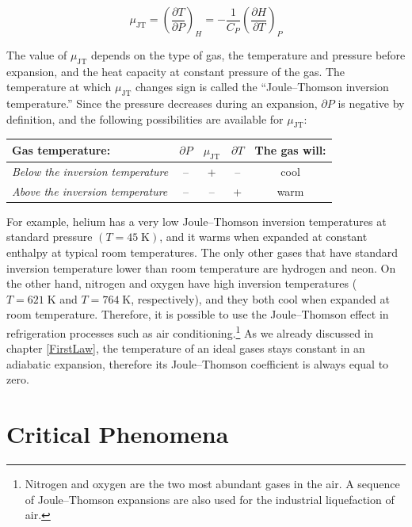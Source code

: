 \documentclass[
  9pt,
]{extbook}
\theoremstyle{definition}
\theoremstyle{definition}
\theoremstyle{definition}
\theoremstyle{remark}
\begin{document}
\begin{equation}
\mu_{\mathrm{JT}}=\left( \frac{\partial T}{\partial P} \right)_H=-\frac{1}{C_P} \left( \frac{\partial H}{\partial T} \right)_P
\label{eq:muJT}
\end{equation}

The value of \(\mu_{\mathrm{JT}}\) depends on the type of gas, the temperature and pressure before expansion, and the heat capacity at constant pressure of the gas. The temperature at which \(\mu_{\mathrm{JT}}\) changes sign is called the ``Joule--Thomson inversion temperature.'' Since the pressure decreases during an expansion, \(\partial P\) is negative by definition, and the following possibilities are available for \(\mu_{\mathrm{JT}}\):

\begin{longtable}[]{@{}lcccc@{}}
\toprule
Gas temperature: & \(\partial P\) & \(\mu_{\mathrm{JT}}\) & \(\partial T\) & The gas will: \\
\midrule
\endhead
\emph{Below the inversion temperature} & -- & + & -- & cool \\
\emph{Above the inversion temperature} & -- & -- & + & warm \\
\bottomrule
\end{longtable}

For example, helium has a very low Joule--Thomson inversion temperatures at standard pressure \((T=45\;\text{K})\), and it warms when expanded at constant enthalpy at typical room temperatures. The only other gases that have standard inversion temperature lower than room temperature are hydrogen and neon. On the other hand, nitrogen and oxygen have high inversion temperatures (\(T=621\;\text{K}\) and \(T=764\;\text{K}\), respectively), and they both cool when expanded at room temperature. Therefore, it is possible to use the Joule--Thomson effect in refrigeration processes such as air conditioning.\footnote{Nitrogen and oxygen are the two most abundant gases in the air. A sequence of Joule--Thomson expansions are also used for the industrial liquefaction of air.} As we already discussed in chapter \ref{FirstLaw}, the temperature of an ideal gases stays constant in an adiabatic expansion, therefore its Joule--Thomson coefficient is always equal to zero.

\hypertarget{critical-phenomena}{%
\section{Critical Phenomena}\label{critical-phenomena}}
\end{document}
